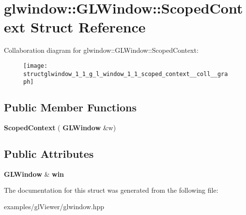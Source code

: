 \section{glwindow\+:\+:G\+L\+Window\+:\+:Scoped\+Context Struct Reference}
\label{structglwindow_1_1_g_l_window_1_1_scoped_context}


Collaboration diagram for glwindow\+:\+:G\+L\+Window\+:\+:Scoped\+Context\+:\nopagebreak
\begin{figure}[H]
\begin{center}
\leavevmode
\texttt{[image: structglwindow\_1\_1\_g\_l\_window\_1\_1\_scoped\_context\_\_coll\_\_graph]}
\end{center}
\end{figure}
\subsection*{Public Member Functions}
\begin{DoxyCompactItemize}
\item 
\mbox{\label{structglwindow_1_1_g_l_window_1_1_scoped_context_a50c8bb3920c309f393427a712ef92fab}} 
{\bfseries Scoped\+Context} (\textbf{ G\+L\+Window} \&w)
\end{DoxyCompactItemize}
\subsection*{Public Attributes}
\begin{DoxyCompactItemize}
\item 
\mbox{\label{structglwindow_1_1_g_l_window_1_1_scoped_context_a4d650e6dd6b405ea6f6b344b3e98a3af}} 
\textbf{ G\+L\+Window} \& {\bfseries win}
\end{DoxyCompactItemize}


The documentation for this struct was generated from the following file\+:\begin{DoxyCompactItemize}
\item 
examples/gl\+Viewer/glwindow.\+hpp\end{DoxyCompactItemize}
